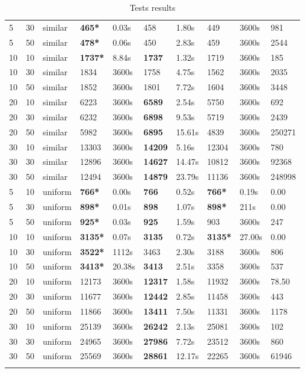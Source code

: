 \begin{scriptsize}
\begin{longtable}{@{\extracolsep{\fill}}l|l|l|ll|ll|lll@{}}
 5 & 30 & similar& \textbf{465*}& 0.03s& 458& 1.80s & 449& 3600s& 981 \\
 5 & 50 & similar& \textbf{478*}& 0.06s& 450& 2.83s & 459& 3600s& 2544 \\
 10 & 10 & similar& \textbf{1737*}& 8.84s& \textbf{1737}& 1.32s & 1719& 3600s& 185 \\
 10 & 30 & similar& 1834& 3600s& 1758& 4.75s & 1562& 3600s& 2035 \\
 10 & 50 & similar& 1852& 3600s& 1801& 7.72s & 1604& 3600s& 3448 \\
 20 & 10 & similar& 6223& 3600s& \textbf{6589}& 2.54s & 5750& 3600s& 692 \\
 20 & 30 & similar& 6232& 3600s& \textbf{6898}& 9.53s & 5719& 3600s& 2439 \\
 20 & 50 & similar& 5982& 3600s& \textbf{6895}& 15.61s & 4839& 3600s& 250271 \\
 30 & 10 & similar& 13303& 3600s& \textbf{14209}& 5.16s & 12304& 3600s& 780 \\
 30 & 30 & similar& 12896& 3600s& \textbf{14627}& 14.47s & 10812& 3600s& 92368 \\
 30 & 50 & similar& 12494& 3600s& \textbf{14879}& 23.79s & 11136& 3600s& 248998 \\
 5 & 10 & uniform& \textbf{766*}& 0.00s& \textbf{766}& 0.52s & \textbf{766*}& 0.19s & 0.00 \\
 5 & 30 & uniform& \textbf{898*}& 0.01s& \textbf{898}& 1.07s & \textbf{898*}& 211s & 0.00 \\
 5 & 50 & uniform& \textbf{925*}& 0.03s& \textbf{925}& 1.59s & 903& 3600s& 247 \\
 10 & 10 & uniform& \textbf{3135*}& 0.07s& \textbf{3135}& 0.72s & \textbf{3135*}& 27.00s & 0.00 \\
 10 & 30 & uniform& \textbf{3522*}& 1112s & 3463& 2.30s & 3188& 3600s& 806 \\
 10 & 50 & uniform& \textbf{3413*}& 20.38s& \textbf{3413}& 2.51s & 3358& 3600s& 537 \\
 20 & 10 & uniform& 12173& 3600s& \textbf{12317}& 1.58s & 11932& 3600s& 78.50 \\
 20 & 30 & uniform& 11677& 3600s& \textbf{12442}& 2.85s & 11458& 3600s& 443 \\
 20 & 50 & uniform& 11866& 3600s& \textbf{13411}& 7.50s & 11331& 3600s& 1178 \\
 30 & 10 & uniform& 25139& 3600s& \textbf{26242}& 2.13s & 25081& 3600s& 102 \\
 30 & 30 & uniform& 24965& 3600s& \textbf{27986}& 7.72s & 23512& 3600s& 860 \\
 30 & 50 & uniform& 25569& 3600s& \textbf{28861}& 12.17s & 22265& 3600s& 61946 \\
\hline 
\caption{Tests results}\\ 
\end{longtable}
\end{scriptsize}

